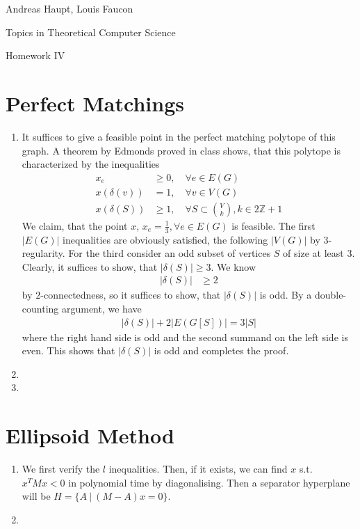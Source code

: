 \documentclass{scrartcl}
\newcommand\1{\mathbf{1}}
\begin{document}
Andreas Haupt, Louis Faucon

Topics in Theoretical Computer Science 

Homework IV


\section{Perfect Matchings}
\begin{enumerate}
\item
It suffices to give a feasible point in the perfect matching polytope of this graph. A theorem by Edmonds proved in class shows, that this polytope is characterized by the inequalities
\begin{align*}
x_e &\ge 0 , \quad \forall e \in E (G) \\
x(\delta (v)) &=1, \quad \forall v \in V(G) \\
x (\delta (S)) &\ge 1, \quad \forall S \subset \binom{V}{k}, k \in 2\mathbb{Z}+1
\end{align*}
We claim, that the point $x$, $x_e = \frac{1}{3}, \forall e \in E(G)$ is feasible. The first $\lvert E(G)\rvert$ inequalities are obviously satisfied, the following $\lvert V(G)\rvert$ by $3$-regularity. For the third consider an odd subset of vertices $S$ of size at least $3$. Clearly, it suffices to show, that $\lvert \delta (S) \rvert \ge 3$. We know
\begin{align*}
\lvert\delta (S)\rvert &\ge 2
\end{align*}
by $2$-connectedness, so it suffices to show, that $\lvert \delta (S) \rvert$ is odd. By a double-counting argument, we have
\begin{align*}
\lvert \delta (S) \rvert + 2\lvert E(G[S])\rvert = 3 \lvert S \rvert
\end{align*}
where the right hand side is odd and the second summand on the left side is even. This shows that $\lvert \delta (S) \rvert$ is odd and completes the proof.
\item
\item
\end{enumerate}

\section{Ellipsoid Method}
\begin{enumerate}
\item
We first verify the $l$ inequalities. Then, if it exists, we can find $x$ s.t. $x^T M x < 0$ in polynomial time by diagonalising. Then a separator hyperplane will be $H = \{A\ |\ (M-A) x = 0\}$. 

\item


\end{enumerate}
\end{document}
